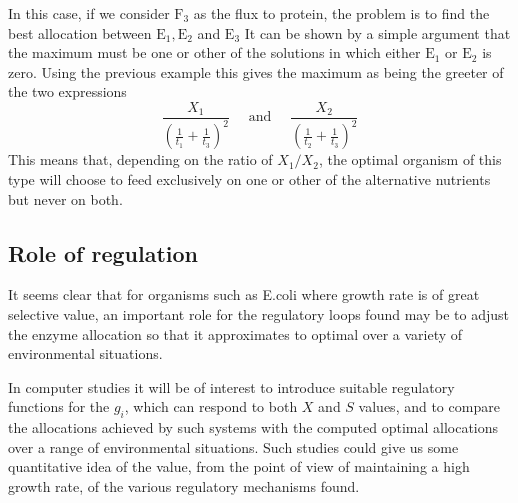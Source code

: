 In this case, if we consider $\mathrm{F}_{3}$ as the flux to protein, the problem is to find the best allocation between $\mathrm{E}_{1}, \mathrm{E}_{2}$ and $\mathrm{E}_{3}$ It can be shown by a simple argument that the maximum must be one or other of the solutions in which either $\mathrm{E}_{1}$ or $\mathrm{E}_{2}$ is zero. Using the previous example this gives the maximum as being the greeter of the two expressions
%
$$
\frac{X_{1}}{\left(\frac{1}{t_{1}}+\frac{1}{t_{3}}\right)^{2}} \quad\text{ and }\quad \frac{X_{2}}{\left(\frac{1}{t_{2}}+\frac{1}{t_{3}}\right)^{2}}
$$
%
This means that, depending on the ratio of $X_{1}/X_{2}$, the optimal organism of this type will choose to feed exclusively on one or other of the alternative nutrients but never on both.

\subsection*{Role of regulation}

It seems clear that for organisms such as E.coli where growth rate is of great selective value, an important role for the regulatory loops found may be to adjust the enzyme allocation so that it approximates to optimal over a variety of environmental situations.

In computer studies it will be of interest to introduce suitable regulatory functions for the $g_{i}$, which can respond to both $X$ and $S$ values, and to compare the allocations achieved by such systems with the computed optimal allocations over a range of environmental situations. Such studies could give us some quantitative idea of the value, from the point of view of maintaining a high growth rate, of the various regulatory mechanisms found. 